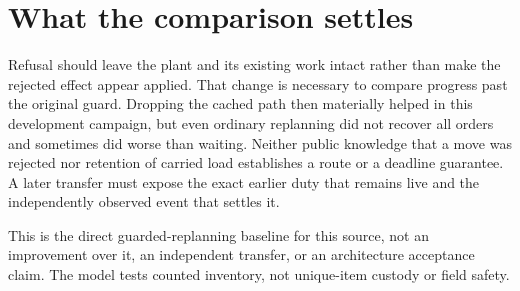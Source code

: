 \documentclass[11pt]{article}
\begin{document}
\section{What the comparison settles}
Refusal should leave the plant and its existing work intact
rather than make the rejected effect appear applied. That
change is necessary to compare progress past the original
guard. Dropping the cached path then materially helped in this
development campaign, but even ordinary replanning did not
recover all orders and sometimes did worse than waiting.
Neither public knowledge that a move was rejected nor retention
of carried load establishes a route or a deadline guarantee.
A later transfer must expose the exact earlier duty that remains
live and the independently observed event that settles it.

This is the direct guarded-replanning baseline for this source,
not an improvement over it, an independent transfer, or an
architecture acceptance claim. The model tests counted inventory,
not unique-item custody or field safety.
\end{document}

